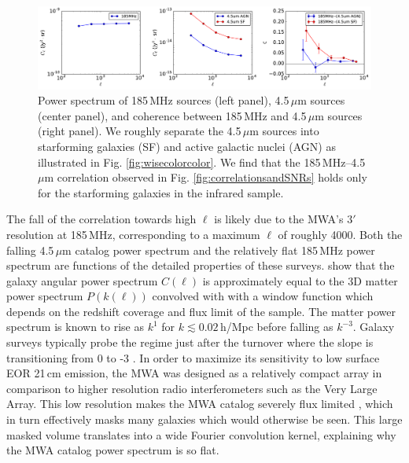\documentclass[numberedappendix]{emulateapj}
\begin{document}
\begin{figure}[h]
\centering
\includegraphics[width=7in]{mwa_wise_qsoagn_gal_xspec.pdf}
\caption[Auto and cross spectra of 185\,MHz and 4.5\,$\mu$m sources, for both AGN and SF cuts of the infrared catalog.]{Power spectrum of 185\,MHz sources (left panel), 4.5\,$\mu$m sources (center panel), and coherence between 185\,MHz and 4.5\,$\mu$m sources (right panel). We roughly separate the 4.5\,$\mu$m sources into starforming galaxies (SF) and active galactic nuclei (AGN) as illustrated in Fig.  \ref{fig:wisecolorcolor}. We find that the 185\,MHz--4.5\,$\mu$m correlation observed in Fig. \ref{fig:correlationsandSNRs} holds only for the starforming galaxies in the infrared sample. }
\label{fig:wisexspec}
\end{figure}

The fall of the correlation towards high $\ell$ is likely due to the MWA's $3'$ resolution at 185\,MHz, corresponding to a maximum $\ell$ of roughly 4000. Both the falling 4.5\,$\mu$m catalog power spectrum and the relatively flat 185\,MHz power spectrum are functions of the detailed properties of these surveys. \citet{tegmark02,dodelson02} show that the galaxy angular power spectrum $C(\ell)$ is approximately equal to the 3D matter power spectrum $P(k(\ell))$ convolved with with a window function which depends on the redshift coverage and flux limit of the sample. The matter power spectrum is known to rise as $k^{1}$ for $k\lesssim0.02$\,h/Mpc before falling as $k^{-3}$. Galaxy surveys typically probe the regime just after the turnover where the slope is transitioning from 0 to -3 \citep{tegmark02b}. In order to maximize its sensitivity to low surface EOR 21\,cm emission, the MWA was designed as a relatively compact array in comparison to higher resolution radio interferometers such as the Very Large Array. This low resolution makes the MWA catalog severely flux limited \citep{PattiCatalog1}, which in turn effectively masks many galaxies which would otherwise be seen. This large masked volume translates into a wide Fourier convolution kernel, explaining why the MWA catalog power spectrum is so flat. 
\end{document}
